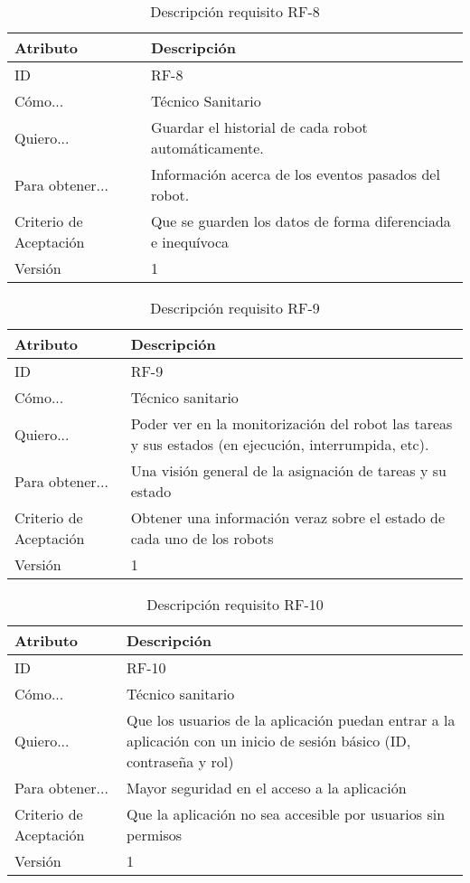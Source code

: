 
\begin{table}[H]
    \label{tab:reqJ1}
 	\caption{Descripción requisito RF-8}
	\centering
	
	\begin{tabular}{C{3cm}|C{12cm}}
 		\toprule
 		\textbf{Atributo} & \textbf{Descripción} \\
 		\midrule
 	    ID & RF-8 \\
 	    Cómo... & Técnico Sanitario \\
 	    Quiero... & Guardar el historial de cada robot automáticamente. \\
 	    Para obtener... & Información acerca de los eventos pasados del robot.  \\
 	    Criterio de Aceptación & Que se guarden los datos de forma diferenciada e inequívoca  \\
 	    Versión & 1 \\
 		\bottomrule
 		\end{tabular}
\end{table}
\begin{table}[H]
    \label{tab:reqF2}
 	\caption{Descripción requisito RF-9}
	\centering

	\begin{tabular}{C{3cm}|C{12cm}}
 		\toprule
 		\textbf{Atributo} & \textbf{Descripción} \\
 		\midrule
 	    ID & RF-9 \\
 	    Cómo... & Técnico sanitario \\
 	    Quiero... & Poder ver en la monitorización del robot las tareas y sus estados (en ejecución, interrumpida, etc). \\
 	    Para obtener... & Una visión general de la asignación de tareas y su estado  \\
 	    Criterio de Aceptación & Obtener una información veraz sobre el estado de cada uno de los robots \\
 	    Versión & 1 \\
 		\bottomrule
 		\end{tabular}
\end{table}

\begin{table}[H]
    \label{tab:reqF2}
 	\caption{Descripción requisito RF-10}
	\centering

	\begin{tabular}{C{3cm}|C{12cm}}
 		\toprule
 		\textbf{Atributo} & \textbf{Descripción} \\
 		\midrule
 	    ID & RF-10 \\
 	    Cómo... & Técnico sanitario \\
 	    Quiero... & Que los usuarios de la aplicación puedan entrar a la aplicación con un inicio de sesión básico (ID, contraseña y rol) \\
 	    Para obtener... & Mayor seguridad en el acceso a la aplicación  \\
 	    Criterio de Aceptación & Que la aplicación no sea accesible por usuarios sin permisos \\
 	    Versión & 1 \\
 		\bottomrule
 		\end{tabular}
\end{table}

